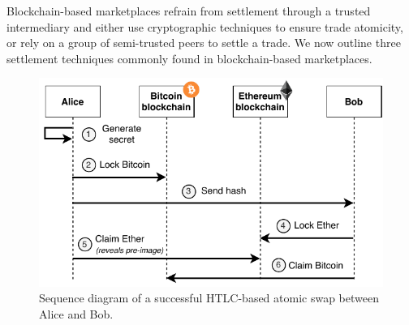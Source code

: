 
Blockchain-based marketplaces refrain from settlement through a trusted intermediary and either use cryptographic techniques to ensure trade atomicity, or rely on a group of semi-trusted peers to settle a trade.
We now outline three settlement techniques commonly found in blockchain-based marketplaces.

\begin{figure}[t]
	\centering
	\includegraphics[width=.7\linewidth]{introduction/assets/atomic_swap}
	\caption{Sequence diagram of a successful HTLC-based atomic swap between Alice and Bob.}
	\label{fig:atomic_swap_intro}
\end{figure}

